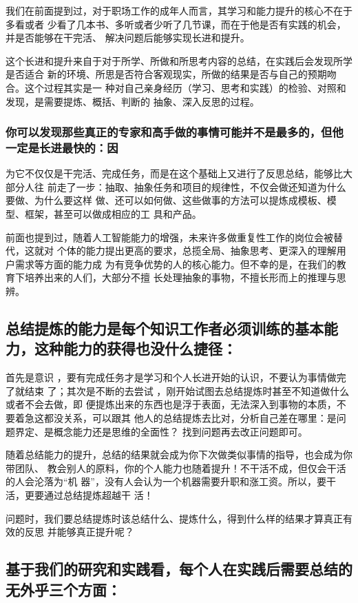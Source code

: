 \documentclass[11pt]{ctexart}
\begin{document}
{{{{我们在前面提到过，对于职场工作的成年人而言，其学习和能力提升的核心不在于多看或者
少看了几本书、多听或者少听了几节课，而在于他是否有实践的机会，并是否能够在干完活、
解决问题后能够实现长进和提升。

这个长进和提升来自于对于所学、所做和所思考内容的总结，在实践后会发现所学是否适合
新的环境、所思是否符合客观现实，所做的结果是否与自己的预期吻合。这个过程其实是一
种对自己亲身经历（学习、思考和实践）的检验、对照和发现，是需要提炼、概括、判断的
抽象、深入反思的过程。

\subsubsection{你可以发现那些真正的专家和高手做的事情可能并不是最多的，但他一定是长进最快的：因}
\label{sec:org443913b}
为它不仅仅是干完活、完成任务，而是在这个基础上又进行了反思总结，能够比大部分人往
前走了一步：抽取、抽象任务和项目的规律性，不仅会做还知道为什么要做、为什么要这样
做、还可以如何做、这些做事的方法可以提炼成模板、模型、框架，甚至可以做成相应的工
具和产品。

前面也提到过，随着人工智能能力的增强，未来许多做重复性工作的岗位会被替代，这就对
个体的能力提出更高的要求，总揽全局、抽象思考、更深入的理解用户需求等方面的能力成
为有竞争优势的人的核心能力。但不幸的是，在我们的教育下培养出来的人们，大部分不擅
长处理抽象的事物，不擅长形而上的推理与思辨。

\subsection{总结提炼的能力是每个知识工作者必须训练的基本能力，这种能力的获得也没什么捷径：}
\label{sec:org67a0252}
首先是意识 ，要有完成任务才是学习和个人长进开始的认识，不要认为事情做完了就结束
了；其次是不断的去尝试 ，刚开始试图去总结提炼时甚至不知道做什么或者不会去做，即
便提炼出来的东西也是浮于表面，无法深入到事物的本质，不要着急这都没关系，可以跟其
他人的总结提炼去比对，分析自己差在哪里：是问题界定、是概念能力还是思维的全面性？
找到问题再去改正问题即可。

随着总结能力的提升，总结的结果就会成为你下次做类似事情的指导，也会成为你带团队、
教会别人的原料，你的个人能力也随着提升！不干活不成，但仅会干活的人会沦落为“机
器”，没有人会认为一个机器需要升职和涨工资。所以，要干活，更要通过总结提炼超越干
活！

问题时，我们要总结提炼时该总结什么、提炼什么，得到什么样的结果才算真正有效的反思
并能够真正提升呢？

\subsection{基于我们的研究和实践看，每个人在实践后需要总结的无外乎三个方面：}
\label{sec:orgeec7bff}

}}}}
\end{document}
